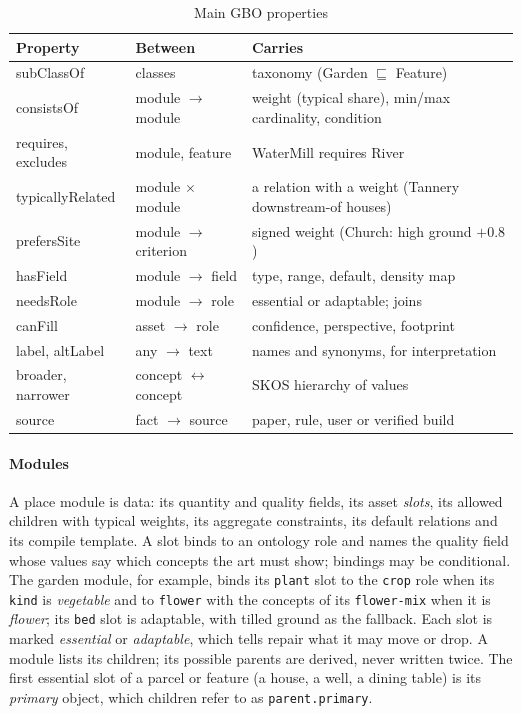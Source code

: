 \documentclass[conference]{IEEEtran}
\begin{document}
\begin{table}[t]
\caption{Main GBO properties}
\label{tab:gbo}
\centering
\footnotesize
\begin{tabular}{@{}>{\ttfamily}p{1.75cm} p{1.75cm} p{4.1cm}@{}}
\hline
\textrm{\textbf{Property}} & \textbf{Between} & \textbf{Carries} \\
\hline
subClassOf & classes & taxonomy (Garden $\sqsubseteq$ Feature) \\
consistsOf & module $\rightarrow$ module & weight (typical share), min/max cardinality, condition \\
requires, excludes & module, feature & WaterMill requires River \\
typically\-Related & module $\times$ module & a relation with a weight (Tannery downstream-of houses) \\
prefersSite & module $\rightarrow$ criterion & signed weight (Church: high ground $+0.8$) \\
hasField & module $\rightarrow$ field & type, range, default, density map \\
needsRole & module $\rightarrow$ role & essential or adaptable; joins \\
canFill & asset $\rightarrow$ role & confidence, perspective, footprint \\
label, altLabel & any $\rightarrow$ text & names and synonyms, for interpretation \\
broader, narrower & concept $\leftrightarrow$ concept & SKOS hierarchy of values \\
source & fact $\rightarrow$ source & paper, rule, user or verified build \\
\hline
\end{tabular}
\end{table}

\paragraph{Modules} A place module is data: its quantity and quality fields, its asset
\emph{slots}, its allowed children with typical weights, its aggregate constraints, its
default relations and its compile template. A slot binds to an ontology role and names
the quality field whose values say which concepts the art must show; bindings may be
conditional. The garden module, for example, binds its \texttt{plant} slot to the
\texttt{crop} role when its \texttt{kind} is \emph{vegetable} and to \texttt{flower}
with the concepts of its \texttt{flower-mix} when it is \emph{flower}; its \texttt{bed}
slot is adaptable, with tilled ground as the fallback. Each slot is marked
\emph{essential} or \emph{adaptable}, which tells repair what it may move or drop. A
module lists its children; its possible parents are derived, never written twice.
The first essential slot of a parcel or feature (a house, a well, a dining table) is its
\emph{primary} object, which children refer to as \texttt{parent.primary}.
\end{document}
